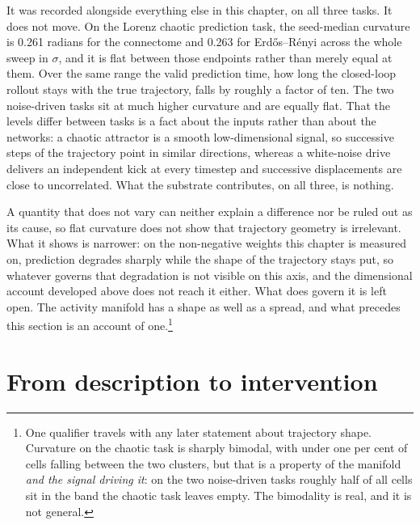 It was recorded alongside everything else in this chapter, on all three tasks.
It does not move. On the Lorenz chaotic
prediction task, the seed-median curvature is
0.261 %
radians for the connectome and
0.263 %
for Erdős--Rényi across the whole sweep in $\sigma$, %
and it is flat between those endpoints rather than merely equal at them. Over
the same range the valid prediction time, how long the closed-loop rollout stays
with the true trajectory, falls by roughly
a factor of ten. %
The two noise-driven tasks sit at much higher curvature and are equally flat.
That the levels differ between tasks is a fact about the inputs rather than
about the networks: a chaotic attractor is a smooth low-dimensional signal, so
successive steps of the trajectory point in similar directions, whereas a
white-noise drive delivers an independent kick at every timestep and successive
displacements are close to uncorrelated. What the substrate contributes, on all
three, is nothing.

A quantity that does not vary can neither explain a difference nor be ruled out
as its cause, so flat curvature does not show that trajectory geometry is
irrelevant. What it shows is narrower: on the non-negative weights this chapter
is measured on, prediction degrades sharply while the shape
of the trajectory stays put, so whatever governs that degradation is not visible
on this axis, and the dimensional account developed above does not reach it
either. What does govern it is left open. The activity manifold has a shape as well 
as a spread, and what precedes this section is an account of one.\footnote{One qualifier
travels with any later statement about trajectory shape. Curvature on the
chaotic task is sharply bimodal, with under one per cent of cells falling
between the two clusters, but that is a property of the manifold \emph{and the
signal driving it}: on the two noise-driven tasks roughly half of all cells sit
in the band the chaotic task leaves empty. %
The bimodality is real, and it is not general.}






\section{From description to intervention}
\label{sec:act2-toact3}
\bigskip


